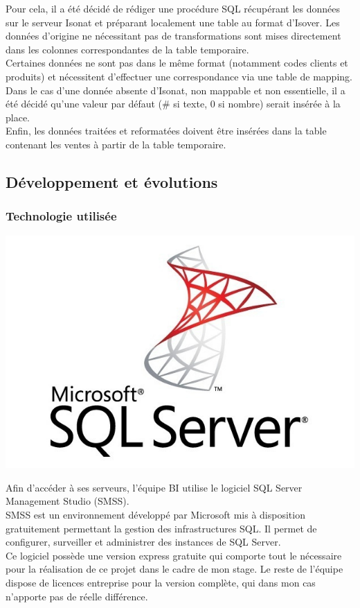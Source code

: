 \documentclass[a4paper,12pt]{article}
\begin{document}
Pour cela, il a été décidé de rédiger une procédure SQL récupérant les données sur le serveur Isonat et préparant localement une table au format d'Isover. Les données d'origine ne nécessitant pas de transformations sont mises directement dans les colonnes correspondantes de la table temporaire. \\
Certaines données ne sont pas dans le même format (notamment codes clients et produits) et nécessitent d'effectuer une correspondance via une table de mapping.\\
Dans le cas d'une donnée absente d'Isonat, non mappable et non essentielle, il a été décidé qu'une valeur par défaut (\# si texte, 0 si nombre) serait insérée à la place. \\

Enfin, les données traitées et reformatées doivent être insérées dans la table contenant les ventes à partir de la table temporaire.


\subsection{Développement et évolutions}
\subsubsection{Technologie utilisée}

\begin{center}
    \includegraphics[scale=0.5]{illustrations/sql-server-icon.jpg}
\end{center}


Afin d'accéder à ses serveurs, l'équipe BI utilise le logiciel SQL Server Management Studio (SMSS).\\
SMSS est un environnement développé par Microsoft mis à disposition gratuitement permettant la gestion des infrastructures SQL. Il permet de configurer, surveiller et administrer des instances de SQL Server.\\
Ce logiciel  possède une version express gratuite qui comporte tout le nécessaire pour la réalisation de ce projet dans le cadre de mon stage. Le reste de l'équipe dispose de licences entreprise pour la version complète, qui dans mon cas n'apporte pas de réelle différence.\\
\end{document}
